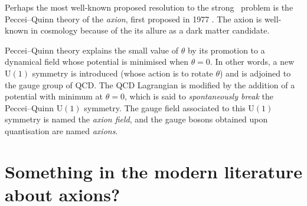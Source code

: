 Perhaps the most well-known proposed resolution to the strong \CP\ problem is the Peccei--Quinn theory of the \emph{axion}, first proposed in 1977 \cite{PecceiQuinn_1977}.
The axion is well-known in cosmology because of the its allure as a dark matter candidate.

Peccei--Quinn theory explains the small value of $\theta$ by its promotion to a dynamical field whose potential is minimised when $\theta = 0$.
In other words, a new $\mathrm{U}(1)$ symmetry is introduced (whose action is to rotate $\theta$) and is adjoined to the gauge group of QCD.
The QCD Lagrangian is modified by the addition of a potential with minimum at $\theta = 0$, which is said to \emph{spontaneously break} the Peccei--Quinn $\mathrm{U}(1)$ symmetry.
The gauge field associated to this $\mathrm{U}(1)$ symmetry is named the \emph{axion field}, and the gauge bosons obtained upon quantisation are named \emph{axions}.


\section{Something in the modern literature about axions?}